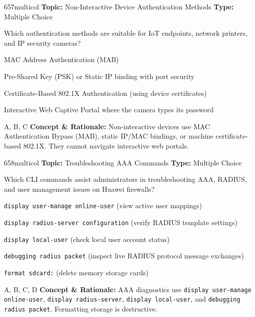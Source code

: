 \begin{qcard}{657}{multicol}
\textcolor{darkslate!75}{\small\textbf{Topic:} Non-Interactive Device Authentication Methods \hfill \textbf{Type:} Multiple Choice}\vspace{0.4em}\par
Which authentication methods are suitable for IoT endpoints, network printers, and IP security cameras?
\begin{qoptions}
\item MAC Address Authentication (MAB)
\item Pre-Shared Key (PSK) or Static IP binding with port security
\item Certificate-Based 802.1X Authentication (using device certificates)
\item Interactive Web Captive Portal where the camera types its password
\end{qoptions}
\end{qcard}
\nopagebreak
\begin{explainbox}{A, B, C}
\textbf{Concept \& Rationale:} Non-interactive devices use MAC Authentication Bypass (MAB), static IP/MAC bindings, or machine certificate-based 802.1X. They cannot navigate interactive web portals.
\end{explainbox}

\begin{qcard}{658}{multicol}
\textcolor{darkslate!75}{\small\textbf{Topic:} Troubleshooting AAA Commands \hfill \textbf{Type:} Multiple Choice}\vspace{0.4em}\par
Which CLI commands assist administrators in troubleshooting AAA, RADIUS, and user management issues on Huawei firewalls?
\begin{qoptions}
\item \texttt{display user-manage online-user} (view active user mappings)
\item \texttt{display radius-server configuration} (verify RADIUS template settings)
\item \texttt{display local-user} (check local user account status)
\item \texttt{debugging radius packet} (inspect live RADIUS protocol message exchanges)
\item \texttt{format sdcard:} (delete memory storage cards)
\end{qoptions}
\end{qcard}
\nopagebreak
\begin{explainbox}{A, B, C, D}
\textbf{Concept \& Rationale:} AAA diagnostics use \texttt{display user-manage online-user}, \texttt{display radius-server}, \texttt{display local-user}, and \texttt{debugging radius packet}. Formatting storage is destructive.
\end{explainbox}

